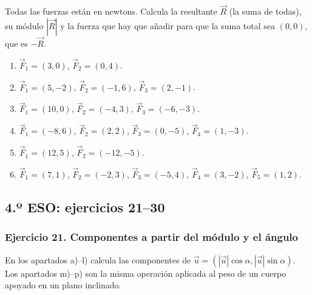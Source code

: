 Todas las fuerzas están en newtons. Calcula la resultante $\vec{R}$ (la suma de todas), su módulo $|\vec{R}|$ y la fuerza que hay que añadir para que la suma total sea $(0,0)$, que es $-\vec{R}$.

\begin{enumerate}
    \item[a)] $\vec{F}_1=(3,0)$, $\vec{F}_2=(0,4)$.
    \item[b)] $\vec{F}_1=(5,-2)$, $\vec{F}_2=(-1,6)$, $\vec{F}_3=(2,-1)$.
    \item[c)] $\vec{F}_1=(10,0)$, $\vec{F}_2=(-4,3)$, $\vec{F}_3=(-6,-3)$.
    \item[d)] $\vec{F}_1=(-8,6)$, $\vec{F}_2=(2,2)$,
    $\vec{F}_3=(0,-5)$, $\vec{F}_4=(1,-3)$.
    \item[e)] $\vec{F}_1=(12,5)$, $\vec{F}_2=(-12,-5)$.
    \item[f)] $\vec{F}_1=(7,1)$, $\vec{F}_2=(-2,3)$,
    $\vec{F}_3=(-5,4)$, $\vec{F}_4=(3,-2)$, $\vec{F}_5=(1,2)$.
\end{enumerate}

\subsection{4.º ESO: ejercicios 21--30}

\subsubsection*{Ejercicio 21. Componentes a partir del módulo y el ángulo}

En los apartados a)--l) calcula las componentes de
$\vec{u}=(|\vec{u}|\cos\alpha,|\vec{u}|\sin\alpha)$.
Los apartados m)--p) son la misma operación aplicada al peso de un cuerpo apoyado en un plano inclinado.

